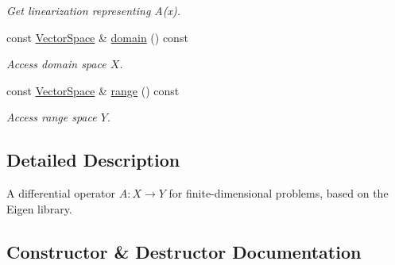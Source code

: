 \begin{DoxyCompactItemize}
\begin{DoxyCompactList}\small\item\em Get linearization representing A\textquotesingle{}(x). \end{DoxyCompactList}\item 
const \hyperlink{classSpacy_1_1VectorSpace}{Vector\+Space} \& \hyperlink{classSpacy_1_1OperatorBase_a2588f9b3e0188820c4c494e63293dc6f}{domain} () const \hypertarget{classSpacy_1_1OperatorBase_a2588f9b3e0188820c4c494e63293dc6f}{}\label{classSpacy_1_1OperatorBase_a2588f9b3e0188820c4c494e63293dc6f}

\begin{DoxyCompactList}\small\item\em Access domain space $X$. \end{DoxyCompactList}\item 
const \hyperlink{classSpacy_1_1VectorSpace}{Vector\+Space} \& \hyperlink{classSpacy_1_1OperatorBase_ab19d3b7a6f290b1079248f1e567e53d6}{range} () const \hypertarget{classSpacy_1_1OperatorBase_ab19d3b7a6f290b1079248f1e567e53d6}{}\label{classSpacy_1_1OperatorBase_ab19d3b7a6f290b1079248f1e567e53d6}

\begin{DoxyCompactList}\small\item\em Access range space $Y$. \end{DoxyCompactList}\end{DoxyCompactItemize}


\subsection{Detailed Description}
A differential operator $A:X\rightarrow Y$ for finite-\/dimensional problems, based on the Eigen library. 

\subsection{Constructor \& Destructor Documentation}
